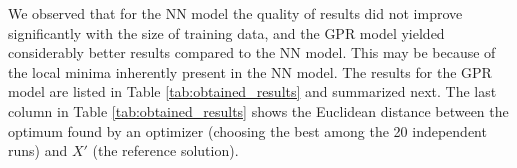 %
We observed that for the NN model the quality of results did not improve significantly with the size of training data, and the GPR model yielded considerably better results compared to the NN model. This may be because of the local minima inherently present in the NN model. The results for the GPR model are listed in Table \ref{tab:obtained_results} and summarized next.
%
The last column in Table \ref{tab:obtained_results} shows the Euclidean distance between the optimum found by an optimizer (choosing the best among the 20 independent runs) and $X'$ (the reference solution).  
%

